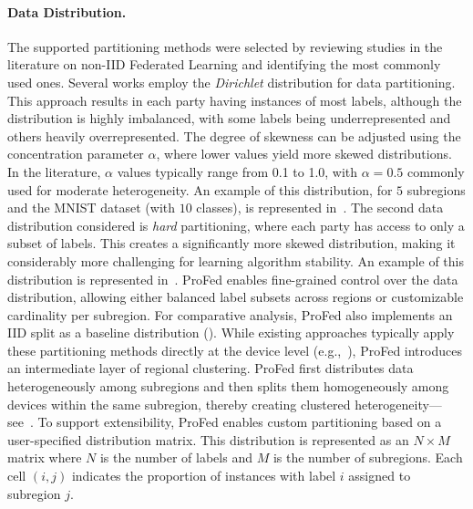 \paragraph{Data Distribution.} The supported partitioning methods were selected 
 by reviewing studies in the literature on non-IID 
 Federated Learning and identifying the most commonly used ones.
%
Several works employ the \emph{Dirichlet} distribution for data partitioning. 
%
This approach results in each party having instances of most labels, 
 although the distribution is highly imbalanced, 
 with some labels being underrepresented and others heavily overrepresented.
%
The degree of skewness can be adjusted using the concentration parameter 
 $\alpha$, where lower values yield more skewed distributions.
%
In the literature, $\alpha$ values typically range from 0.1 to 1.0, 
 with $\alpha=0.5$ commonly used for moderate heterogeneity.
%
An example of this distribution, for $5$ subregions and the MNIST dataset (with $10$ classes), 
 is represented in~.
%
The second data distribution considered is \emph{hard} partitioning,
 where each party has access to only a subset of labels.
%
This creates a significantly more skewed distribution, 
 making it considerably more challenging for learning algorithm stability.
%
An example of this distribution is represented in~.
%
ProFed enables fine-grained control over the data distribution, allowing either 
 balanced label subsets across regions or customizable cardinality per subregion.
%
For comparative analysis, ProFed also implements an IID split as a baseline distribution ().
%
While existing approaches typically apply these partitioning methods 
 directly at the device level (e.g.,~\cite{DBLP:journals/corr/abs-2302-02949,DBLP:conf/nips/LinKSJ20}), 
 ProFed introduces an intermediate layer of regional clustering.
% 
ProFed first distributes data heterogeneously among subregions and 
 then splits them homogeneously among devices within the same subregion,
 thereby creating clustered heterogeneity---see~.
%
To support extensibility, ProFed enables custom partitioning 
 based on a user-specified distribution matrix. 
%
This distribution is represented as an $N \times M$ matrix 
 where $N$ is the number of labels and $M$ is the number of subregions. 
%
Each cell $(i,j)$ indicates the proportion of instances with label $i$ 
 assigned to subregion $j$.

